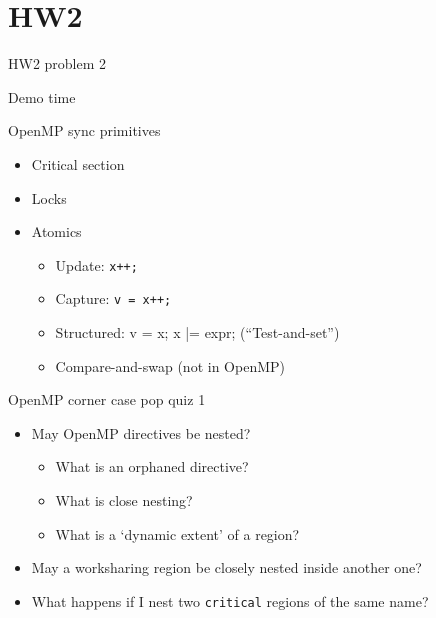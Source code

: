 \documentclass[english,compress]{beamer}
\begin{document}
\section{HW2}
\begin{frame}{HW2 problem 2}
  \begin{center}
  \Huge Demo time
  \end{center}
\end{frame}
\begin{frame}{OpenMP sync primitives}
  \begin{itemize}[<+->]
    \item Critical section
    \item Locks
    \item Atomics
      \begin{itemize}
        \item Update: \texttt{x++;}
        \item Capture: \texttt{v = x++;}
        \item Structured: {v = x; x |= expr;} (``Test-and-set'')
        \item Compare-and-swap (not in OpenMP)
      \end{itemize}
  \end{itemize}
\end{frame}
\begin{frame}{OpenMP corner case pop quiz 1}
  \begin{itemize}[<+->]
    \item May OpenMP directives be nested?
      \begin{itemize}
        \item What is an orphaned directive?
        \item What is close nesting?
        \item What is a `dynamic extent' of a region?
      \end{itemize}
    \item May a worksharing region be closely nested inside
      another one?
    \item What happens if I nest two \texttt{critical} regions
      of the same name?
  \end{itemize}
\end{frame}
\end{document}
